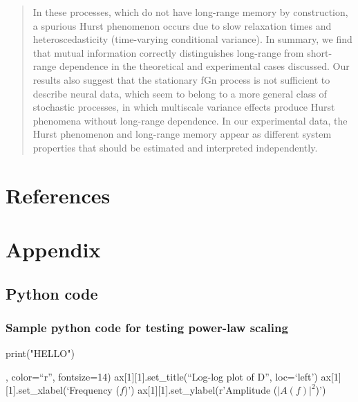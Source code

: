 \documentclass[
  sn-vancouver,
  Numbered,
  referee,
  lineno]{sn-jnl}
\newenvironment{Shaded}{\begin{snugshade}}{\end{snugshade}}
\newcommand{\BuiltInTok}[1]{\textcolor[rgb]{0.00,0.23,0.31}{#1}}
\newcommand{\NormalTok}[1]{\textcolor[rgb]{0.00,0.23,0.31}{#1}}
\newcommand{\StringTok}[1]{\textcolor[rgb]{0.13,0.47,0.30}{#1}}
\begin{document}
\begin{quote}
In these processes, which do not have long-range memory by construction,
a spurious Hurst phenomenon occurs due to slow relaxation times and
heteroscedasticity (time-varying conditional variance). In summary, we
find that mutual information correctly distinguishes long-range from
short-range dependence in the theoretical and experimental cases
discussed. Our results also suggest that the stationary fGn process is
not sufficient to describe neural data, which seem to belong to a more
general class of stochastic processes, in which multiscale variance
effects produce Hurst phenomena without long-range dependence. In our
experimental data, the Hurst phenomenon and long-range memory appear as
different system properties that should be estimated and interpreted
independently.
\end{quote}

\newpage{}

\section{References}\label{references-1}


\newpage{}

\section{Appendix}\label{appendix-1}

\subsection{Python code}\label{python-code-1}

\subsubsection{Sample python code for testing power-law
scaling}\label{sec-powerlawscalingcode}

\begin{Shaded}
\begin{Highlighting}[]
\BuiltInTok{print}\NormalTok{(}\StringTok{"HELLO"}\NormalTok{)}
\end{Highlighting}
\end{Shaded}

, color=``r'', fontsize=14) ax{[}1{]}{[}1{]}.set\_title(``Log-log plot
of D'', loc=`left') ax{[}1{]}{[}1{]}.set\_xlabel(`Frequency (\(f\))')
ax{[}1{]}{[}1{]}.set\_ylabel(r'Amplitude (\(|A(f)|^{2}\))')
\end{document}
